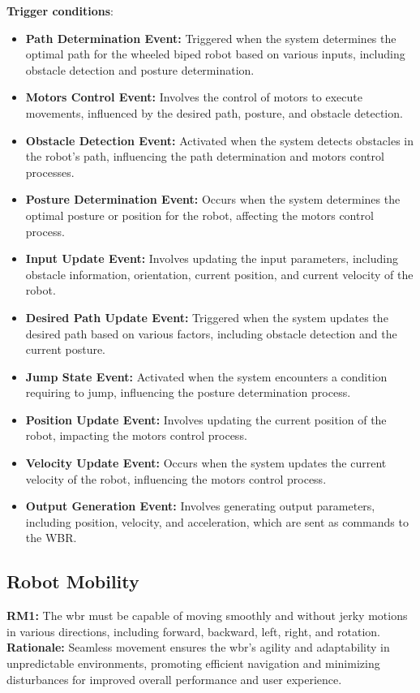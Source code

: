 \documentclass[12pt]{article}
\begin{document}
\textbf{Trigger conditions}:
\begin{itemize}
    \item \textbf{Path Determination Event: }Triggered when the system determines the optimal path for the wheeled biped robot based on various inputs, including obstacle detection and posture determination.
    \item \textbf{Motors Control Event: } Involves the control of motors to execute movements, influenced by the desired path, posture, and obstacle detection.
    \item \textbf{Obstacle Detection Event: } Activated when the system detects obstacles in the robot's path, influencing the path determination and motors control processes.
    \item \textbf{Posture Determination Event: } Occurs when the system determines the optimal posture or position for the robot, affecting the motors control process.
    \item \textbf{Input Update Event: } Involves updating the input parameters, including obstacle information, orientation, current position, and current velocity of the robot.
    \item \textbf{Desired Path Update Event: } Triggered when the system updates the desired path based on various factors, including obstacle detection and the current posture.
    \item \textbf{Jump State Event: } Activated when the system encounters a condition requiring to jump, influencing the posture determination process.
    \item \textbf{Position Update Event: } Involves updating the current position of the robot, impacting the motors control process.
    \item \textbf{Velocity Update Event: } Occurs when the system updates the current velocity of the robot, influencing the motors control process.
    \item \textbf{Output Generation Event: } Involves generating output parameters, including position, velocity, and acceleration, which are sent as commands to the WBR.
\end{itemize}

\subsection{Robot Mobility}
\noindent\textbf{RM1:} The \acrshort{wbr} must be capable of moving smoothly and without jerky motions in various directions, including forward, backward, left, right, and rotation.\\
\noindent\textbf{Rationale:}  Seamless movement ensures the \acrshort{wbr}'s agility and adaptability in unpredictable environments, promoting efficient navigation and minimizing disturbances for improved overall performance and user experience.\\
\end{document}
